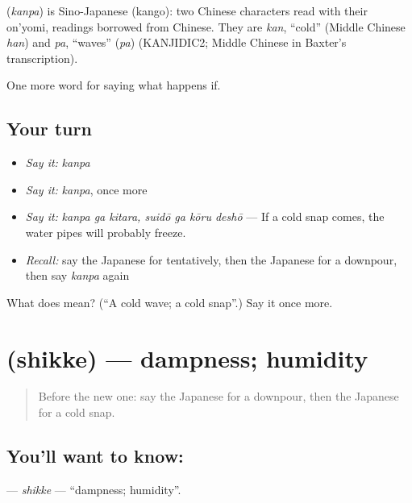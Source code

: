 \begin{cousinweb}
\textbf{} (\emph{kanpa}) is Sino-Japanese (kango): two Chinese characters read with their on'yomi, readings borrowed from Chinese. They are \emph{kan}, \textquotedblleft{}cold\textquotedblright{} (Middle Chinese \emph{han}) and \emph{pa}, \textquotedblleft{}waves\textquotedblright{} (\emph{pa}) (KANJIDIC2; Middle Chinese in Baxter's transcription).
\end{cousinweb}

\begin{grammarlens}[title={What you've built}]
One more word for saying what happens if.
\end{grammarlens}

\subsection*{Your turn}
\begin{itemize}
\raggedright
  \item \emph{Say it:} \emph{kanpa}
  \item \emph{Say it:} \emph{kanpa}, once more
  \item \emph{Say it:} \emph{kanpa ga kitara, suidō ga kōru deshō} — If a cold snap comes, the water pipes will probably freeze.
  \item \emph{Recall:} say the Japanese for tentatively, then the Japanese for a downpour, then say \emph{kanpa} again
\end{itemize}

\begin{tcolorbox}[breakable,colback=teal!4,colframe=teal!35!black,title={Before you move on}]
What does  mean? (\textquotedblleft{}A cold wave; a cold snap\textquotedblright{}.) Say it once more.
\end{tcolorbox}
\section[\texorpdfstring{\ja{しっけ} (shikke)}{しっけ (shikke)}]{ (shikke) — dampness; humidity}

\label{lesson:JA-C354-shikke}



\begin{quote}
Before the new one: say the Japanese for a downpour, then the Japanese for a cold snap.
\end{quote}

\subsection*{You'll want to know: }
\textbf{} — \emph{shikke} — \textquotedblleft{}dampness; humidity\textquotedblright{}.

